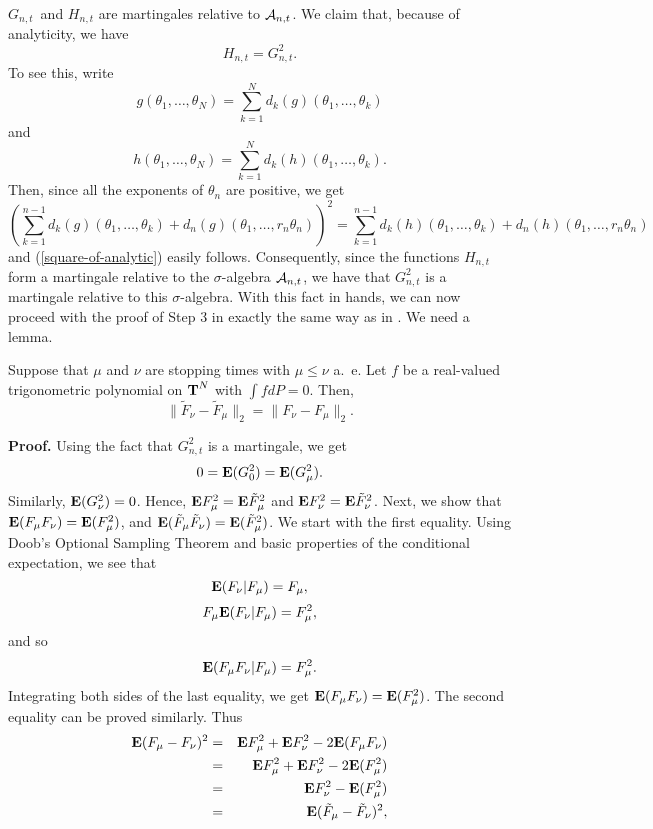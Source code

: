 $G_{n,t}$\ and $H_{n,t}$ are martingales relative to 
${\cal A}_{n,t}$. 
We claim that, because of analyticity, we have
\begin{equation}
H_{n,t} = G_{n,t}^2. 
\label{square-of-analytic}
\end{equation} 
To see this, write 
$$ g(\theta_1,\dots,\theta_N) = 
\sum_{k=1}^N d_k(g)(\theta_1,\dots,\theta_k) $$
and
$$ h(\theta_1,\dots,\theta_N) = 
\sum_{k=1}^N d_k(h)(\theta_1,\dots,\theta_k).$$
Then, since all the exponents of $\theta_n$ are positive, 
we get
%
%
%
%
$$
 \left( \sum_{k=1}^{n-1} d_k(g)(\theta_1,\dots,\theta_k) +
   d_n(g)(\theta_1,\dots,r_n\theta_n) \right)^2
   =
   \sum_{k=1}^{n-1} d_k(h)(\theta_1,\dots,\theta_k) +
   d_n(h)(\theta_1,\dots,r_n\theta_n) $$
%
%
%
and (\ref{square-of-analytic}) easily follows. Consequently,
since the
functions $H_{n,t}$ form a martingale relative
to the $\sigma$-algebra ${\cal A}_{n,t}$, we have that
$G_{n,t}^2$ is a martingale relative to this
$\sigma$-algebra.  With this fact in hands,
we can now proceed with
the proof of Step 3 in exactly the same way as in
 \cite[pp. 148-149]{bgs}.  We need a lemma.  
\begin{lemma5.3}
Suppose that $\mu$ and $\nu$ are stopping times with
$\mu\leq \nu$ a.\ e.  Let $f$ be a real-valued
trigonometric polynomial
on $\T^N$
with $\int f dP  = 0$.  Then,
$$\| \tilde{F}_\nu -\tilde{F}_\mu \|_2=
\|  F_\nu -F_\mu \|_2.$$
\label{lemma5.3}
\end{lemma5.3}
%
%
%
{\bf Proof.}  Using the fact that $G_{n,t}^2$
is a martingale, we get
$$
0=\E(G_0^2)=\E(G_\mu^2).$$
Similarly, 
$\E(G_{\nu}^2)=0$.  
Hence, $\E F_\mu^2 = \E \tilde{F}_\mu^2$ and 
$\E F_\nu^2 = \E \tilde{F}_\nu^2$.
Next, we show that 
$\E(F_\mu F_\nu)= \E(F_\mu^2)$, and 
$\E(\tilde{F}_\mu \tilde{F}_\nu)= \E(\tilde{F}_\mu^2)$.
We start with the first equality.  Using Doob's Optional Sampling
Theorem and basic properties of the conditional 
expectation, we see that
%
%
%
$$\E(F_\nu | F_\mu)=F_\mu ,$$ %
%
%
%
%
%
$$F_\mu \E(F_\nu | F_\mu)=F_\mu^2 ,$$ %
%
%
and so
%
%
%
%
%
$$\E(F_\mu F_\nu | F_\mu)=F_\mu^2 .$$ %
%
%
Integrating both sides of the
last equality, we get $\E(F_\mu F_\nu)= \E(F_\mu^2)$.
The second equality can be proved similarly.  Thus
\begin{eqnarray*}
\E(F_\mu -F_\nu)^2      &=&     \E F^2_\mu + \E F^2_\nu -2 \E (F_\mu F_\nu)\\
                        &=&     \E F^2_\mu + \E F^2_\nu -2 \E (F_\mu^2) \\
                        &=&     \E F^2_\nu - \E (F_\mu^2)               \\
                        &=&     \E(\tilde{F}_\mu - \tilde{F}_\nu)^2,
\end{eqnarray*}
